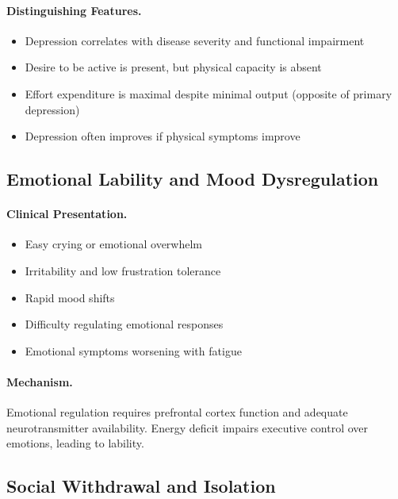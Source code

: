 \paragraph{Distinguishing Features.}
\begin{itemize}
    \item Depression correlates with disease severity and functional impairment
    \item Desire to be active is present, but physical capacity is absent
    \item Effort expenditure is maximal despite minimal output (opposite of primary depression)
    \item Depression often improves if physical symptoms improve
\end{itemize}

\subsection{Emotional Lability and Mood Dysregulation}
\label{subsec:emotional-lability}

\paragraph{Clinical Presentation.}
\begin{itemize}
    \item Easy crying or emotional overwhelm
    \item Irritability and low frustration tolerance
    \item Rapid mood shifts
    \item Difficulty regulating emotional responses
    \item Emotional symptoms worsening with fatigue
\end{itemize}

\paragraph{Mechanism.}
Emotional regulation requires prefrontal cortex function and adequate neurotransmitter availability. Energy deficit impairs executive control over emotions, leading to lability.

\subsection{Social Withdrawal and Isolation}
\label{subsec:social-withdrawal}

